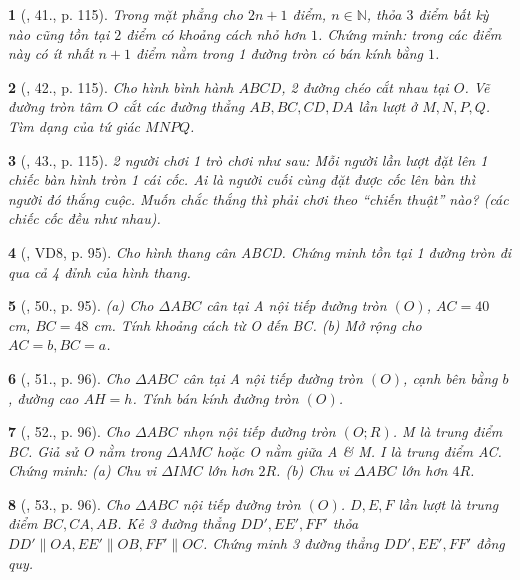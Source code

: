 \documentclass{article}
\newtheorem{baitoan}{}
\begin{document}
\begin{baitoan}[\cite{Tuyen_Toan_9_old}, 41., p. 115]
	Trong mặt phẳng cho $2n + 1$ điểm, $n\in\mathbb{N}$, thỏa $3$ điểm bất kỳ nào cũng tồn tại $2$ điểm có khoảng cách nhỏ hơn $1$. Chứng minh: trong các điểm này có ít nhất $n + 1$ điểm nằm trong 1 đường tròn có bán kính bằng $1$.
\end{baitoan}

\begin{baitoan}[\cite{Tuyen_Toan_9_old}, 42., p. 115]
	Cho hình bình hành $ABCD$, 2 đường chéo cắt nhau tại $O$. Vẽ đường tròn tâm $O$ cắt các đường thẳng $AB,BC,CD,DA$ lần lượt ở $M,N,P,Q$. Tìm dạng của tứ giác $MNPQ$.
\end{baitoan}

\begin{baitoan}[\cite{Tuyen_Toan_9_old}, 43., p. 115]
	2 người chơi 1 trò chơi như sau: Mỗi người lần lượt đặt lên 1 chiếc bàn hình tròn 1 cái cốc. Ai là người cuối cùng đặt được cốc lên bàn thì người đó thắng cuộc. Muốn chắc thắng thì phải chơi theo ``chiến thuật'' nào? (các chiếc cốc đều như nhau).
\end{baitoan}

\begin{baitoan}[\cite{Binh_Toan_9_tap_1}, VD8, p. 95]
	Cho hình thang cân ABCD. Chứng minh tồn tại 1 đường tròn đi qua cả 4 đỉnh của hình thang.
\end{baitoan}

\begin{baitoan}[\cite{Binh_Toan_9_tap_1}, 50., p. 95]
	(a) Cho $\Delta ABC$ cân tại A nội tiếp đường tròn $(O)$, $AC = 40$ {\rm cm}, $BC = 48$ {\rm cm}. Tính khoảng cách từ O đến BC. (b) Mở rộng cho $AC = b,BC = a$.
\end{baitoan}

\begin{baitoan}[\cite{Binh_Toan_9_tap_1}, 51., p. 96]
	Cho $\Delta ABC$ cân tại A nội tiếp đường tròn $(O)$, cạnh bên bằng $b$, đường cao $AH = h$. Tính bán kính đường tròn $(O)$.
\end{baitoan}

\begin{baitoan}[\cite{Binh_Toan_9_tap_1}, 52., p. 96]
	Cho $\Delta ABC$ nhọn nội tiếp đường tròn $(O;R)$. M là trung điểm BC. Giả sử O nằm trong $\Delta AMC$ hoặc O nằm giữa A \& M. I là trung điểm AC. Chứng minh: (a) Chu vi $\Delta IMC$ lớn hơn $2R$. (b) Chu vi $\Delta ABC$ lớn hơn $4R$.
\end{baitoan}

\begin{baitoan}[\cite{Binh_Toan_9_tap_1}, 53., p. 96]
	Cho $\Delta ABC$ nội tiếp đường tròn $(O)$. $D,E,F$ lần lượt là trung điểm $BC,CA,AB$. Kẻ 3 đường thẳng $DD',EE',FF'$ thỏa $DD'\parallel OA,EE'\parallel OB,FF'\parallel OC$. Chứng minh 3 đường thẳng $DD',EE',FF'$ đồng quy.
\end{baitoan}
\end{document}
